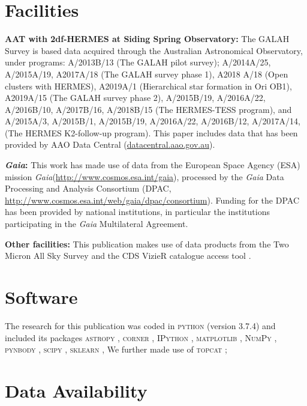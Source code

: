 \documentclass[fleqn,usenatbib]{mnras}
\newcommand{\Gaia}{\textit{Gaia}\xspace} %
\begin{document}
\section*{Facilities}

\textbf{AAT with 2df-HERMES at Siding Spring Observatory:} The GALAH Survey is based data acquired through the Australian Astronomical Observatory, under programs: A/2013B/13 (The GALAH pilot survey); A/2014A/25, A/2015A/19, A2017A/18 (The GALAH survey phase 1), A2018 A/18 (Open clusters with HERMES), A2019A/1 (Hierarchical star formation in Ori OB1), A2019A/15 (The GALAH survey phase 2), A/2015B/19, A/2016A/22, A/2016B/10, A/2017B/16, A/2018B/15 (The HERMES-TESS program), and A/2015A/3, A/2015B/1, A/2015B/19, A/2016A/22, A/2016B/12, A/2017A/14, (The HERMES K2-follow-up program). This paper includes data that has been provided by AAO Data Central (\url{datacentral.aao.gov.au}).

\textbf{\Gaia: } This work has made use of data from the European Space Agency (ESA) mission \Gaia (\url{http://www.cosmos.esa.int/gaia}), processed by the \Gaia Data Processing and Analysis Consortium (DPAC, \url{http://www.cosmos.esa.int/web/gaia/dpac/consortium}). Funding for the DPAC has been provided by national institutions, in particular the institutions participating in the \Gaia Multilateral Agreement. 

\textbf{Other facilities:} This publication makes use of data products from the Two Micron All Sky Survey \citep{Skrutskie2006} and the CDS VizieR catalogue access tool \citep{Vizier2000}.

\section*{Software}

The research for this publication was coded in \textsc{python} (version 3.7.4) and included its packages
\textsc{astropy} \citep[v. 3.2.2;][]{Robitaille2013,PriceWhelan2018},
\textsc{corner} \citep[v. 2.0.1;][]{corner},
\textsc{IPython} \citep[v. 7.8.0;][]{ipython},
\textsc{matplotlib} \citep[v. 3.1.3;][]{matplotlib},
\textsc{NumPy} \citep[v. 1.17.2;][]{numpy},
\textsc{pynbody} \citep[v. 1.1.0;][]{pynbody},
\textsc{scipy} \citep[version 1.3.1;][]{scipy},
\textsc{sklearn} \citep[v. 0.21.3;][]{scikit-learn},
We further made use of \textsc{topcat} \citep[version 4.7;][]{Taylor2005};

\section*{Data Availability}
\end{document}
